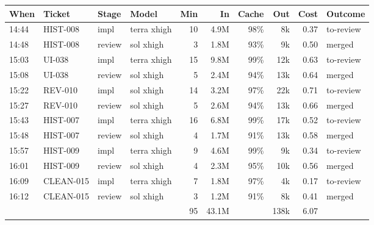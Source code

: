 \documentclass[11pt,a4paper]{article}
\begin{document}
{\small
\begin{tabularx}{\linewidth}{@{}llllrrrrrX@{}}
\toprule
When & Ticket & Stage & Model & Min & In & Cache & Out & Cost & Outcome \\
\midrule
14:44 & HIST-008 & impl & terra xhigh & 10 & 4.9M & 98\% & 8k & 0.37 & to-review \\
14:48 & HIST-008 & review & sol xhigh & 3 & 1.8M & 93\% & 9k & 0.50 & merged \\
15:03 & UI-038 & impl & terra xhigh & 15 & 9.8M & 99\% & 12k & 0.63 & to-review \\
15:08 & UI-038 & review & sol xhigh & 5 & 2.4M & 94\% & 13k & 0.64 & merged \\
15:22 & REV-010 & impl & sol xhigh & 14 & 3.2M & 97\% & 22k & 0.71 & to-review \\
15:27 & REV-010 & review & sol xhigh & 5 & 2.6M & 94\% & 13k & 0.66 & merged \\
15:43 & HIST-007 & impl & terra xhigh & 16 & 6.8M & 99\% & 17k & 0.52 & to-review \\
15:48 & HIST-007 & review & sol xhigh & 4 & 1.7M & 91\% & 13k & 0.58 & merged \\
15:57 & HIST-009 & impl & terra xhigh & 9 & 4.6M & 99\% & 9k & 0.34 & to-review \\
16:01 & HIST-009 & review & sol xhigh & 4 & 2.3M & 95\% & 10k & 0.56 & merged \\
16:09 & CLEAN-015 & impl & terra xhigh & 7 & 1.8M & 97\% & 4k & 0.17 & to-review \\
16:12 & CLEAN-015 & review & sol xhigh & 3 & 1.2M & 91\% & 8k & 0.41 & merged \\
\midrule
 & & & & 95 & 43.1M & & 138k & 6.07 & \\
\bottomrule
\end{tabularx}
}

\begin{center}
\end{center}
\end{document}
